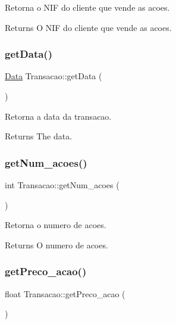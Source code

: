 Retorna o N\+IF do cliente que vende as acoes. 

\begin{DoxyReturn}{Returns}
O N\+IF do cliente que vende as acoes. 
\end{DoxyReturn}
\hypertarget{class_transacao_a94162db1ef8a17eee755c3a3c1d7744b}{}\label{class_transacao_a94162db1ef8a17eee755c3a3c1d7744b} 
\subsubsection{\texorpdfstring{get\+Data()}{getData()}}
{\footnotesize\ttfamily \hyperlink{class_data}{Data} Transacao\+::get\+Data (\begin{DoxyParamCaption}{ }\end{DoxyParamCaption})}



Retorna a data da transacao. 

\begin{DoxyReturn}{Returns}
The data. 
\end{DoxyReturn}
\hypertarget{class_transacao_af52a47c91fe23258ddd212a78f044297}{}\label{class_transacao_af52a47c91fe23258ddd212a78f044297} 
\subsubsection{\texorpdfstring{get\+Num\+\_\+acoes()}{getNum\_acoes()}}
{\footnotesize\ttfamily int Transacao\+::get\+Num\+\_\+acoes (\begin{DoxyParamCaption}{ }\end{DoxyParamCaption})}



Retorna o numero de acoes. 

\begin{DoxyReturn}{Returns}
O numero de acoes. 
\end{DoxyReturn}
\hypertarget{class_transacao_a04806fca6de35ac9f57044c2bd2c39b3}{}\label{class_transacao_a04806fca6de35ac9f57044c2bd2c39b3} 
\subsubsection{\texorpdfstring{get\+Preco\+\_\+acao()}{getPreco\_acao()}}
{\footnotesize\ttfamily float Transacao\+::get\+Preco\+\_\+acao (\begin{DoxyParamCaption}{ }\end{DoxyParamCaption})}



